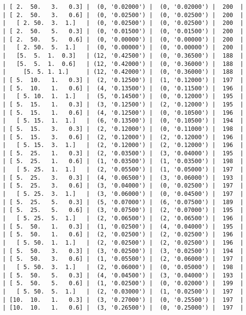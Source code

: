 \documentclass{article}
\begin{document}
\begin{verbatim}
| [ 2.  50.   3.   0.3] |  (0, '0.02000') |  (0, '0.02000') |  200  |
| [ 2.  50.   3.   0.6] |  (0, '0.02500') |  (0, '0.02500') |  200  |
|   [ 2. 50.  3.  1.]   |  (0, '0.02500') |  (0, '0.02500') |  200  |
| [ 2.  50.   5.   0.3] |  (0, '0.01500') |  (0, '0.01500') |  200  |
| [ 2.  50.   5.   0.6] |  (0, '0.00000') |  (0, '0.00000') |  200  |
|   [ 2. 50.  5.  1.]   |  (0, '0.00000') |  (0, '0.00000') |  200  |
|   [5.  5.  1.  0.3]   | (12, '0.42500') |  (0, '0.36500') |  188  |
|   [5.  5.  1.  0.6]   | (12, '0.42000') |  (0, '0.36000') |  188  |
|     [5. 5. 1. 1.]     | (12, '0.42000') |  (0, '0.36000') |  188  |
| [ 5.  10.   1.   0.3] |  (2, '0.12500') |  (1, '0.12000') |  197  |
| [ 5.  10.   1.   0.6] |  (4, '0.13500') |  (0, '0.11500') |  196  |
|   [ 5. 10.  1.  1.]   |  (5, '0.14500') |  (0, '0.12000') |  195  |
| [ 5.  15.   1.   0.3] |  (3, '0.12500') |  (2, '0.12000') |  195  |
| [ 5.  15.   1.   0.6] |  (4, '0.12500') |  (0, '0.10500') |  196  |
|   [ 5. 15.  1.  1.]   |  (6, '0.13500') |  (0, '0.10500') |  194  |
| [ 5.  15.   3.   0.3] |  (2, '0.12000') |  (0, '0.11000') |  198  |
| [ 5.  15.   3.   0.6] |  (2, '0.12000') |  (2, '0.12000') |  196  |
|   [ 5. 15.  3.  1.]   |  (2, '0.12000') |  (2, '0.12000') |  196  |
| [ 5.  25.   1.   0.3] |  (2, '0.03500') |  (3, '0.04000') |  195  |
| [ 5.  25.   1.   0.6] |  (1, '0.03500') |  (1, '0.03500') |  198  |
|   [ 5. 25.  1.  1.]   |  (2, '0.05500') |  (1, '0.05000') |  197  |
| [ 5.  25.   3.   0.3] |  (4, '0.06500') |  (3, '0.06000') |  193  |
| [ 5.  25.   3.   0.6] |  (3, '0.04000') |  (0, '0.02500') |  197  |
|   [ 5. 25.  3.  1.]   |  (3, '0.06000') |  (0, '0.04500') |  197  |
| [ 5.  25.   5.   0.3] |  (5, '0.07000') |  (6, '0.07500') |  189  |
| [ 5.  25.   5.   0.6] |  (3, '0.07500') |  (2, '0.07000') |  195  |
|   [ 5. 25.  5.  1.]   |  (2, '0.06500') |  (2, '0.06500') |  196  |
| [ 5.  50.   1.   0.3] |  (1, '0.02500') |  (4, '0.04000') |  195  |
| [ 5.  50.   1.   0.6] |  (2, '0.02500') |  (2, '0.02500') |  196  |
|   [ 5. 50.  1.  1.]   |  (2, '0.02500') |  (2, '0.02500') |  196  |
| [ 5.  50.   3.   0.3] |  (3, '0.02500') |  (3, '0.02500') |  194  |
| [ 5.  50.   3.   0.6] |  (1, '0.05500') |  (2, '0.06000') |  197  |
|   [ 5. 50.  3.  1.]   |  (2, '0.06000') |  (0, '0.05000') |  198  |
| [ 5.  50.   5.   0.3] |  (4, '0.04500') |  (3, '0.04000') |  193  |
| [ 5.  50.   5.   0.6] |  (1, '0.02500') |  (0, '0.02000') |  199  |
|   [ 5. 50.  5.  1.]   |  (2, '0.03000') |  (1, '0.02500') |  197  |
| [10.  10.   1.   0.3] |  (3, '0.27000') |  (0, '0.25500') |  197  |
| [10.  10.   1.   0.6] |  (3, '0.26500') |  (0, '0.25000') |  197  |

\end{verbatim}
\end{document}
